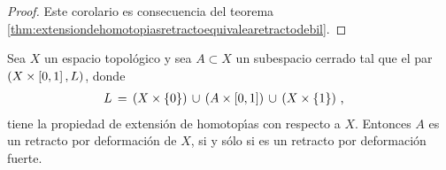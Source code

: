 \begin{proof}
	Este corolario es consecuencia del teorema
	\ref{thm:extensiondehomotopiasretractoequivalearetractodebil}.
\end{proof}

\begin{teoExtensionDeHomotopiasYDeformaciones}%
	\label{thm:extensiondehomotopiasydeformaciones}
	Sea $X$ un espacio topol\'{o}gico y sea $A\subset X$ un subespacio
	cerrado tal que el par $(X\times\left[0,1\right],L)$, donde
	\begin{align*}
		L & \,=\,(X\times\{0\})\,\cup\,(A\times\left[0,1\right])\,\cup\,
			(X\times\{1\})
		\text{ ,}
	\end{align*}
	tiene la propiedad de extensi\'{o}n de homotop\'{\i}as con respecto a
	$X$. Entonces $A$ es un retracto por deformaci\'{o}n de $X$, si y
	s\'{o}lo si es un retracto por deformaci\'{o}n fuerte.
\end{teoExtensionDeHomotopiasYDeformaciones}

